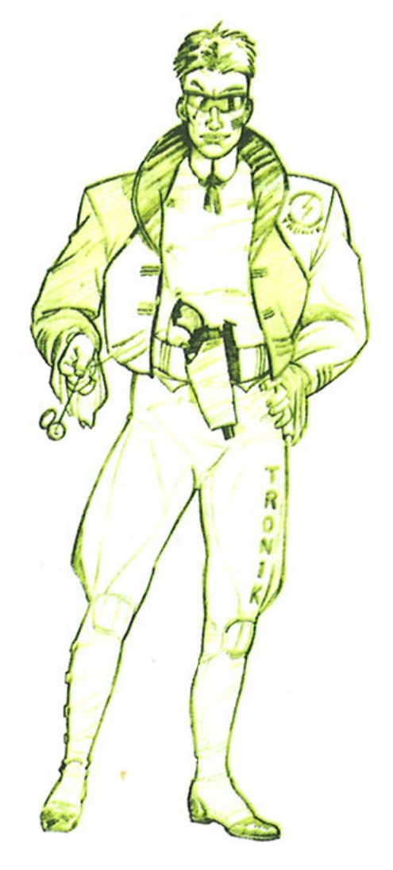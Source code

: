 \documentclass[40pt,twoside,a4paper]{article}
\begin{document}
\begin{landscape}
\begin{minipage}[ht]{0.10\textwidth}
			\includegraphics[width=0.95\textwidth]{../img/personnageJeremiahSteel.jpg} ~\\~\\
		\end{minipage} ~\\

\end{landscape}
\end{document}
